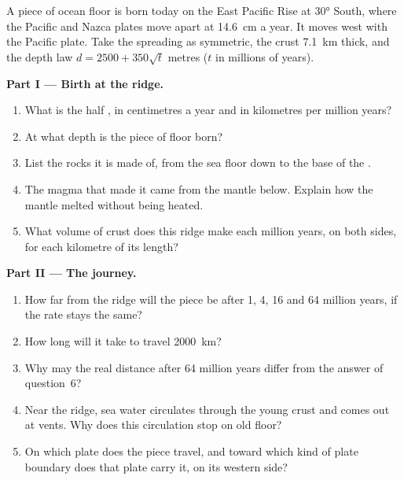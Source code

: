 \begin{problem}
\label{pb:g11:ocean-ridges:1}
A piece of ocean floor is born today on the East Pacific Rise at \ang{30}
South, where the Pacific and Nazca plates move apart at \qty{14.6}{cm} a year.
It moves west with the Pacific plate. Take the spreading as symmetric, the
crust \qty{7.1}{km} thick, and the depth law $d = 2500 + 350\sqrt{t}$ metres
($t$ in millions of years).

\medskip
\noindent\textbf{Part I --- Birth at the ridge.}
\begin{enumerate}
  \item What is the half , in centimetres a year and in
        kilometres per million years?
  \item At what depth is the piece of floor born?
  \item List the rocks it is made of, from the sea floor down to the base of
        the .
  \item The magma that made it came from the mantle below. Explain how the
        mantle melted without being heated.
  \item What volume of crust does this ridge make each million years, on
        both sides, for each kilometre of its length?
\end{enumerate}

\medskip
\noindent\textbf{Part II --- The journey.}
\begin{enumerate}[resume]
  \item How far from the ridge will the piece be after 1, 4, 16 and 64
        million years, if the rate stays the same?
  \item How long will it take to travel \qty{2000}{km}?
  \item Why may the real distance after 64 million years differ from the
        answer of question~6?
  \item Near the ridge, sea water circulates through the young crust and
        comes out at vents. Why does this circulation stop on old floor?
  \item On which plate does the piece travel, and toward which kind of
        plate boundary does that plate carry it, on its western side?
\end{enumerate}


\end{problem}
